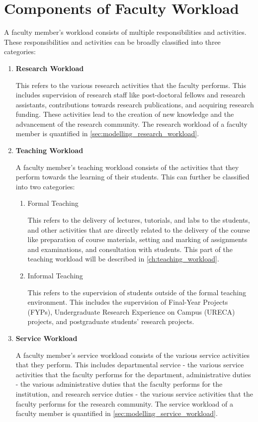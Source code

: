 \section{Components of Faculty Workload}

A faculty member's workload consists of multiple responsibilities and activities. These responsibilities and activities can be broadly classified into three categories:

\begin{enumerate}
  \item \textbf{Research Workload}

        This refers to the various research activities that the faculty performs. This includes supervision of research staff like post-doctoral fellows and research assistants, contributions towards research publications, and acquiring research funding. These activities lead to the creation of new knowledge and the advancement of the research community. The research workload of a faculty member is quantified in \autoref{sec:modelling_research_workload}.

  \item \textbf{Teaching Workload}

        A faculty member's teaching workload consists of the activities that they perform towards the learning of their students. This can further be classified into two categories:

        \begin{enumerate}
          \item Formal Teaching

                This refers to the delivery of lectures, tutorials, and labs to the students, and other activities that are directly related to the delivery of the course like preparation of course materials, setting and marking of assignments and examinations, and consultation with students. This part of the teaching workload will be described in \autoref{ch:teaching_workload}.

          \item Informal Teaching

                This refers to the supervision of students outside of the formal teaching environment. This includes the supervision of Final-Year Projects (FYPs), Undergraduate Research Experience on Campus (URECA) projects, and postgraduate students' research projects.

        \end{enumerate}

  \item \textbf{Service Workload}

        A faculty member's service workload consists of the various service activities that they perform. This includes departmental service - the various service activities that the faculty performs for the department, administrative duties - the various administrative duties that the faculty performs for the institution, and research service duties - the various service activities that the faculty performs for the research community. The service workload of a faculty member is quantified in \autoref{sec:modelling_service_workload}.

\end{enumerate}

